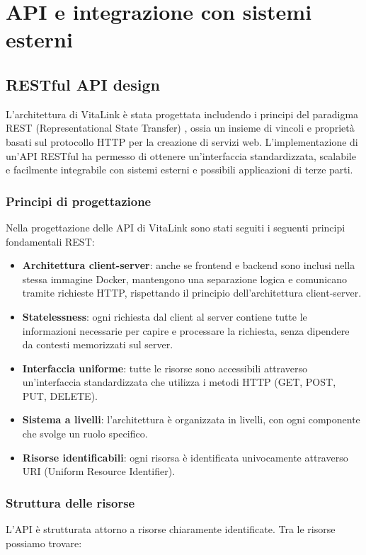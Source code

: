 \documentclass[12pt,a4paper,oneside]{report}
\begin{document}
\section{API e integrazione con sistemi esterni}


\subsection{RESTful API design}
L'architettura di VitaLink è stata progettata includendo i principi del paradigma REST (Representational State Transfer) \cite{rest}, ossia un insieme di vincoli e proprietà basati sul protocollo HTTP per la creazione di servizi web. L'implementazione di un'API RESTful ha permesso di ottenere un'interfaccia standardizzata, scalabile e facilmente integrabile con sistemi esterni e possibili applicazioni di terze parti.

\subsubsection{Principi di progettazione}
Nella progettazione delle API di VitaLink sono stati seguiti i seguenti principi fondamentali REST:

\begin{itemize}
    \item \textbf{Architettura client-server}: anche se frontend e backend sono inclusi nella stessa immagine Docker, mantengono una separazione logica e comunicano tramite richieste HTTP, rispettando il principio dell'architettura client-server.
    \item \textbf{Statelessness}: ogni richiesta dal client al server contiene tutte le informazioni necessarie per capire e processare la richiesta, senza dipendere da contesti memorizzati sul server.
    \item \textbf{Interfaccia uniforme}: tutte le risorse sono accessibili attraverso un'interfaccia standardizzata che utilizza i metodi HTTP (GET, POST, PUT, DELETE).
    \item \textbf{Sistema a livelli}: l'architettura è organizzata in livelli, con ogni componente che svolge un ruolo specifico.
    \item \textbf{Risorse identificabili}: ogni risorsa è identificata univocamente attraverso URI (Uniform Resource Identifier).
\end{itemize}

\subsubsection{Struttura delle risorse}
L'API è strutturata attorno a risorse chiaramente identificate. Tra le risorse possiamo trovare:
\end{document}
